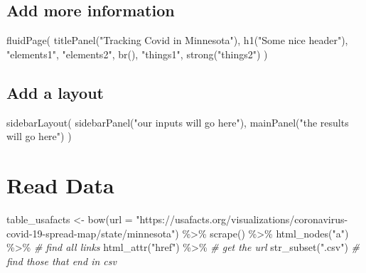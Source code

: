\documentclass[
]{book}
\newenvironment{Shaded}{\begin{snugshade}}{\end{snugshade}}
\newcommand{\AttributeTok}[1]{\textcolor[rgb]{0.77,0.63,0.00}{#1}}
\newcommand{\CommentTok}[1]{\textcolor[rgb]{0.56,0.35,0.01}{\textit{#1}}}
\newcommand{\FunctionTok}[1]{\textcolor[rgb]{0.00,0.00,0.00}{#1}}
\newcommand{\NormalTok}[1]{#1}
\newcommand{\OtherTok}[1]{\textcolor[rgb]{0.56,0.35,0.01}{#1}}
\newcommand{\SpecialCharTok}[1]{\textcolor[rgb]{0.00,0.00,0.00}{#1}}
\newcommand{\StringTok}[1]{\textcolor[rgb]{0.31,0.60,0.02}{#1}}
\begin{document}
\hypertarget{add-more-information}{%
\subsection{Add more information}\label{add-more-information}}

\begin{Shaded}
\begin{Highlighting}[]
\FunctionTok{fluidPage}\NormalTok{(}
  \FunctionTok{titlePanel}\NormalTok{(}\StringTok{"Tracking Covid in Minnesota"}\NormalTok{),}
  \FunctionTok{h1}\NormalTok{(}\StringTok{"Some nice header"}\NormalTok{),}
  \StringTok{"elements1"}\NormalTok{,}
  \StringTok{"elements2"}\NormalTok{,}
  \FunctionTok{br}\NormalTok{(),}
  \StringTok{"things1"}\NormalTok{,}
  \FunctionTok{strong}\NormalTok{(}\StringTok{"things2"}\NormalTok{)}
\NormalTok{)}
\end{Highlighting}
\end{Shaded}

\hypertarget{add-a-layout}{%
\subsection{Add a layout}\label{add-a-layout}}

\begin{Shaded}
\begin{Highlighting}[]
\FunctionTok{sidebarLayout}\NormalTok{(}
  \FunctionTok{sidebarPanel}\NormalTok{(}\StringTok{"our inputs will go here"}\NormalTok{),}
  \FunctionTok{mainPanel}\NormalTok{(}\StringTok{"the results will go here"}\NormalTok{)}
\NormalTok{)}
\end{Highlighting}
\end{Shaded}

\hypertarget{read-data}{%
\section{Read Data}\label{read-data}}

\begin{Shaded}
\begin{Highlighting}[]
\NormalTok{table\_usafacts }\OtherTok{\textless{}{-}} \FunctionTok{bow}\NormalTok{(}\AttributeTok{url =} \StringTok{"https://usafacts.org/visualizations/coronavirus{-}covid{-}19{-}spread{-}map/state/minnesota"}\NormalTok{) }\SpecialCharTok{\%\textgreater{}\%}
  \FunctionTok{scrape}\NormalTok{() }\SpecialCharTok{\%\textgreater{}\%}  \FunctionTok{html\_nodes}\NormalTok{(}\StringTok{"a"}\NormalTok{) }\SpecialCharTok{\%\textgreater{}\%}       \CommentTok{\# find all links}
  \FunctionTok{html\_attr}\NormalTok{(}\StringTok{"href"}\NormalTok{) }\SpecialCharTok{\%\textgreater{}\%}     \CommentTok{\# get the url}
  \FunctionTok{str\_subset}\NormalTok{(}\StringTok{".csv"}\NormalTok{)        }\CommentTok{\# find those that end in csv}
\end{Highlighting}
\end{Shaded}
\end{document}
